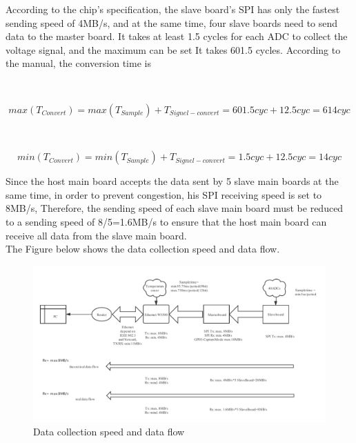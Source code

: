 According to the chip's specification, the slave board's SPI has only the fastest sending speed of 4MB/s, and at the same time, four slave boards need to send data to the master board. It takes at least 1.5 cycles for each ADC to collect the voltage signal, and the maximum can be set It takes 601.5 cycles. According to the manual, the conversion time is 
 
\\
\begin{center} 
\begin{equation}
max(T_{Convert}) =max(T_{Sample})+T_{Signel-convert} =601.5cyc+12.5cyc=614cyc
\end{equation}
\end{center}
\\
\begin{center} 
\begin{equation}
min(T_{Convert})=min(T_{Sample})+T_{Signel-convert} =1.5cyc+12.5cyc=14cyc
\end{equation}
\end{center}

 
Since the host main board accepts the data sent by 5 slave main boards at the same time, in order to prevent congestion, his SPI receiving speed is set to 8MB/s,
Therefore, the sending speed of each slave main board must be reduced to a sending speed of 8/5=1.6MB/s to ensure that the host main board can receive all data from the slave main board.
\\
The Figure below shows the data collection speed and data flow.
\begin{figure}[!ht]
	\centering
	\includegraphics[width=16cm]{grafiken/5.6.pdf}
	\caption{Data collection speed and data flow} 
	\label{fig:5.6}
\end{figure}
\FloatBarrier

